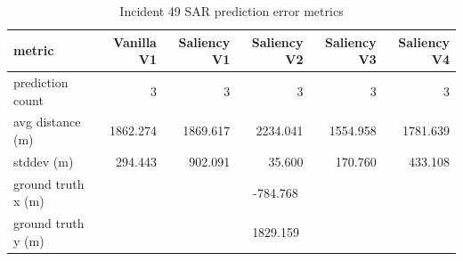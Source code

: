 \begin{table}[ht]
\centering
\caption{Incident 49 SAR prediction error metrics}
\label{tab:sar-incident-49}
\begin{tabular}{lrrrrr}
\hline
metric & Vanilla V1 & Saliency V1 & Saliency V2 & Saliency V3 & Saliency V4 \\
\hline
prediction count & 3 & 3 & 3 & 3 & 3 \\
avg distance (m) & 1862.274 & 1869.617 & 2234.041 & 1554.958 & 1781.639 \\
stddev (m) & 294.443 & 902.091 & 35.600 & 170.760 & 433.108 \\
ground truth x (m) & \multicolumn{5}{c}{-784.768} \\
ground truth y (m) & \multicolumn{5}{c}{1829.159} \\
\hline
\end{tabular}
\end{table}
